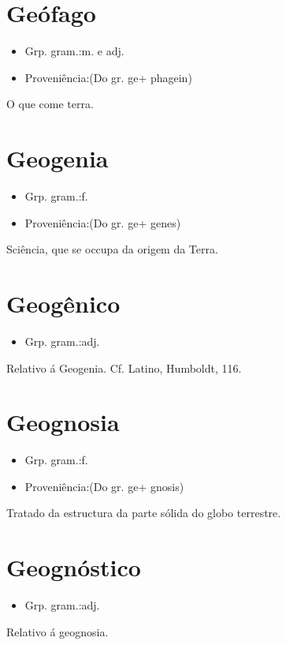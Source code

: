 \section{Geófago}
\begin{itemize}
\item {Grp. gram.:m.  e  adj.}
\end{itemize}
\begin{itemize}
\item {Proveniência:(Do gr. \textunderscore ge\textunderscore  + \textunderscore phagein\textunderscore )}
\end{itemize}
O que come terra.
\section{Geogenia}
\begin{itemize}
\item {Grp. gram.:f.}
\end{itemize}
\begin{itemize}
\item {Proveniência:(Do gr. \textunderscore ge\textunderscore  + \textunderscore genes\textunderscore )}
\end{itemize}
Sciência, que se occupa da origem da Terra.
\section{Geogênico}
\begin{itemize}
\item {Grp. gram.:adj.}
\end{itemize}
Relativo á Geogenia. Cf. Latino, \textunderscore Humboldt\textunderscore , 116.
\section{Geognosia}
\begin{itemize}
\item {Grp. gram.:f.}
\end{itemize}
\begin{itemize}
\item {Proveniência:(Do gr. \textunderscore ge\textunderscore  + \textunderscore gnosis\textunderscore )}
\end{itemize}
Tratado da estructura da parte sólida do globo terrestre.
\section{Geognóstico}
\begin{itemize}
\item {Grp. gram.:adj.}
\end{itemize}
Relativo á geognosia.
